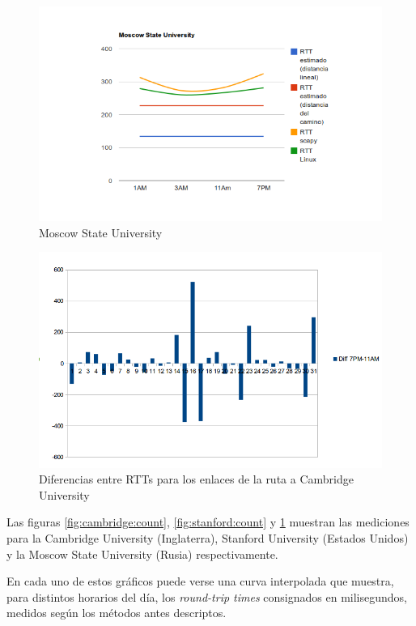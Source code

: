 \begin{figure}[h!]
    \centering
    \includegraphics[width=400pt]{msu.png}
    \caption{Moscow State University}
    \label{fig:msu:count}
\end{figure}

\begin{figure}[h!]
    \centering
    \includegraphics[width=400pt]{cambridge-diff-7PM-11AM.png}
    \caption{Diferencias entre RTTs para los enlaces de la ruta a Cambridge
    University}
    \label{fig:cambridge:diff}
\end{figure}

Las figuras \ref{fig:cambridge:count}, \ref{fig:stanford:count} y
\ref{fig:msu:count} muestran las mediciones para la Cambridge University
(Inglaterra), Stanford University (Estados Unidos) y la Moscow State
University (Rusia) respectivamente.

En cada uno de estos gráficos puede verse una curva interpolada que muestra,
para distintos horarios del día, los \emph{round-trip times} consignados en
milisegundos, medidos según los métodos antes descriptos.

